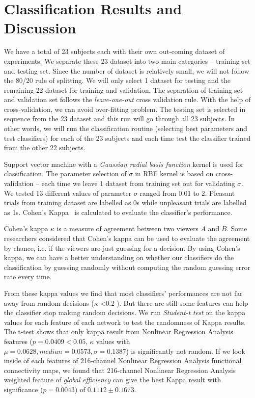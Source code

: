 \documentclass[conference]{IEEEtran}
\begin{document}
\section{Classification Results and Discussion}
We have a total of 23 subjects each with their own out-coming dataset of experiments. We separate these 23 dataset into two main categories -- training set and testing set. Since the number of dataset is relatively small, we will not follow the 80/20 rule of splitting. We will only select 1 dataset for testing and the remaining 22 dataset for training and validation. The separation of training set and validation set follows the \emph{leave-one-out} cross validation rule. With the help of cross-validation, we can avoid over-fitting problem. The testing set is selected in sequence from the 23 dataset and this run will go through all 23 subjects. In other words, we will run the classification routine (selecting best parameters and test classifiers) for each of the 23 subjects and each time test the classifier trained from the other 22 subjects. 

Support vector machine with a \emph{Gaussian radial basis function} kernel is used for classification. The parameter selection of $\sigma$ in RBF kernel is based on cross-validation -- each time we leave 1 dataset from training set out for validating $\sigma$. We tested 13 different values of parameter $\sigma$ ranged from 0.01 to 2. Pleasant trials from training dataset are labelled as 0s while unpleasant trials are labelled as 1s. Cohen's Kappa~\cite{uebersax1987diversity} is calculated to evaluate the classifier's performance. 

Cohen's kappa $\kappa$ is a measure of agreement between two viewers $A$ and $B$. Some researchers considered that Cohen's kappa can be used to evaluate the agreement by chance, i.e. if the viewers are just guessing for a decision. By using Cohen's kappa, we can have a better understanding on whether our classifiers do the classification by guessing randomly without computing the random guessing error rate every time. 

From these kappa values we find that most classifiers' performances are not far away from random decisions ($\kappa$ <0.2 \cite{cohenskappa}). But there are still some features can help the classifier stop making random decisions. We run \emph{Student-t test} on the kappa values for each feature of each network to test the randomness of Kappa results. The t-test shows that only kappa result from Nonlinear Regression Analysis features ($p = 0.0409 < 0.05$, $\kappa$ values with $\mu = 0.0628, median = 0.0573,\sigma = 0.1387$) is significantly not random. If we look inside of each features of 216-channel Nonlinear Regression Analysis functional connectivity maps, we found that  216-channel Nonlinear Regression Analysis weighted feature of \emph{global efficiency} can give the best Kappa result with significance ($p = 0.0043$) of $0.1112 \pm 0.1673$.
\end{document}
